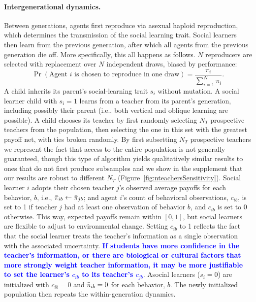 \documentclass[letterpaper,11.5pt]{scrartcl}
\newcommand{\edit}[1]{{\bfseries \textcolor{blue} {#1}}}
\begin{document}
\paragraph{Intergenerational dynamics.} Between generations, agents first reproduce
via asexual haploid reproduction, which determines the transmission of the social
learning trait. Social learners then learn from the previous generation, after which
all agents from the previous generation die off. %
More
specifically, this all happens as follows.  $N$ reproducers are selected with
replacement over $N$ independent draws, biased by performance: 
\begin{equation}
  \Pr(\text{Agent $i$ is chosen to reproduce in one draw}) =
\frac{\pi_i}{\sum_{i=1}^N \pi_i}.  
\end{equation} 
\noindent 
A child inherits its parent's social-learning trait $s_i$ without mutation.  A social learner child with $s_i = 1$ learns from a teacher from its parent's generation, including possibly their parent (i.e., both vertical and oblique learning are possible).  A child chooses its teacher by first randomly selecting $N_T$ prospective teachers from the population, then selecting the one in this set with the greatest payoff net, with ties broken randomly. By first subsetting $N_T$ prospective teachers we represent the fact that access to the entire population is not generally guaranteed, though this type of algorithm yields qualitatively similar results to ones that do not first produce subsamples \citep{smaldino2019open} and we show in the supplement that our results are robust to different $N_T$
(Figure~\ref{fig:nteachersSensitivity}). Social learner $i$ adopts their chosen 
teacher $j$'s observed average payoffs for each behavior, $b$, i.e., 
$\bar\pi_{ib} \leftarrow \bar\pi_{jb}$; 
and agent $i$'s count of behavioral observations, $c_{ib}$, is set to 1 if teacher $j$ had at least
one observation of behavior $b$, and $c_{ib}$ is set to 0 otherwise. This way, expected payoffs
remain within $[0, 1]$, but social learners are flexible to adjust to environmental change. Setting
$c_{ib}$ to 1 reflects the fact that the social learner treats the teacher's information as a single
observation with the associated uncertainty. \edit{If students have more confidence
in the teacher's information, or there are biological or cultural factors that more
strongly weight teacher information, it may be more justifiable to set the learner's $c_{ib}$ to its teacher's $c_{jb}$}. Asocial learners ($s_i = 0$) are initialized with
$c_{ib} = 0$ and $\bar\pi_{ib} = 0$ for each behavior, $b$. %
The newly initialized population then repeats the within-generation dynamics. 
\end{document}
